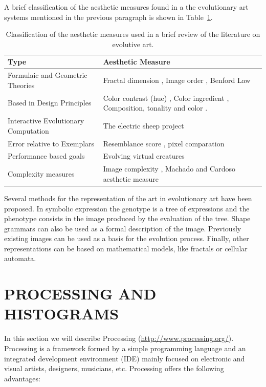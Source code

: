 \documentclass[a4paper,twoside]{article}
\begin{document}
A brief classification of the aesthetic measures found in a the evolutionary art systems mentioned in the previous paragraph is shown in Table~\ref{table_class}.

\begin{table}[!t] 
\renewcommand{\arraystretch}{1.3} 
\caption{Classification of the aesthetic measures used in a brief review of the literature on evolutive art.} 
\label{table_class} 
\centering
\begin{tabular}{|l|l|}
\hline
Type & Aesthetic Measure \\ \hline
Formulaic and Geometric Theories & Fractal dimension \cite{den2010comparing}, Image order \cite{li2012investigating}, Benford Law \cite{del2005benford}\\ \hline
Based in Design Principles &  Color contrast (hue) \cite{den2012evolving},  Color ingredient \cite{li2012investigating}, Composition, tonality and color \cite{dipaola2009incorporating}.\\ \hline
Interactive Evolutionary Computation & The electric sheep project \cite{draves2006electric} \cite{ashlock2006evolutionary,moroni2000vox}\\ \hline
Error relative to Exemplars &  Resemblance score \cite{dipaola2009incorporating}, pixel comparation \cite{aguilar2008robotic}\\ \hline
Performance based goals & Evolving virtual creatures \cite{sims1994evolving} \\\hline
Complexity measures & Image complexity \cite{li2012investigating}, Machado and Cardoso aesthetic measure \cite{machado1998computing}\\ \hline
\end{tabular}
\end{table}

Several methods for the representation of the art in evolutionary art have been proposed. In symbolic expression the genotype is a tree of expressions and the phenotype consists in the image produced  by the evaluation of the tree. Shape grammars can also be used as a formal description of the image. Previously existing images can be used as a basis for the evolution process. Finally, other representations can be based on mathematical models, like fractals or cellular automata.




\section{PROCESSING AND HISTOGRAMS}
\label{sec:processing}
\noindent In this section we will describe Processing (\url{http://www.processing.org/}). Processing \cite{PROCESSING} is a framework formed by a simple programming language and an integrated development environment (IDE) mainly focused on electronic and visual artists, designers, musicians, etc. Processing offers the following advantages:
\end{document}

